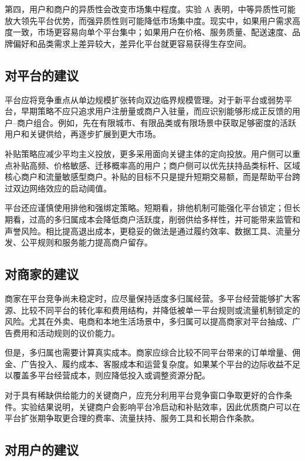 ﻿\documentclass[UTF8,zihao=-4]{ctexart}
\begin{document}
第四，用户和商户的异质性会改变市场集中程度。实验 A 表明，中等异质性可能放大领先平台优势，而强异质性则可能降低市场集中度。现实中，如果用户需求高度一致，市场更容易向单个平台集中；如果用户在价格、服务质量、配送速度、品牌偏好和品类需求上差异较大，差异化平台就更容易获得生存空间。

\subsection{对平台的建议}

平台应将竞争重点从单边规模扩张转向双边临界规模管理。对于新平台或弱势平台，早期策略不应只追求用户注册量或商户入驻量，而应识别能够形成正反馈的用户--商户组合。例如，先在有限城市、有限品类或有限场景中获取足够密度的活跃用户和关键供给，再逐步扩展到更大市场。

补贴策略应减少平均主义投放，更多采用面向关键主体的定向投放。用户侧可以重点补贴高频、价格敏感、迁移概率高的用户；商户侧可以优先扶持品类标杆、区域核心商户和流量敏感型商户。补贴的目标不只是提升短期交易额，而是帮助平台跨过双边网络效应的启动阈值。

平台还应谨慎使用排他和强绑定策略。短期看，排他机制可能强化平台锁定；但长期看，过高的多归属成本会降低商户活跃度，削弱供给多样性，并可能带来监管和声誉风险。相比提高退出成本，更稳妥的做法是通过履约效率、数据工具、流量分发、公平规则和服务能力提高商户留存。

\subsection{对商家的建议}

商家在平台竞争尚未稳定时，应尽量保持适度多归属经营。多平台经营能够扩大客源、比较不同平台的转化率和费用结构，并降低被单一平台规则或流量机制锁定的风险。尤其在外卖、电商和本地生活场景中，多归属可以提高商家对平台抽成、广告费用和活动规则的议价能力。

但是，多归属也需要计算真实成本。商家应综合比较不同平台带来的订单增量、佣金、广告投入、履约成本、客服成本和运营复杂度。如果某个平台的边际收益不足以覆盖多平台经营成本，则应降低投入或调整资源分配。

对于具有稀缺供给能力的关键商户，应充分利用平台竞争窗口争取更好的合作条件。实验结果说明，关键商户会影响平台冷启动和补贴效率，因此优质商户可以在平台扩张期争取更合理的费率、流量扶持、服务工具和长期合作条款。

\subsection{对用户的建议}
\end{document}
